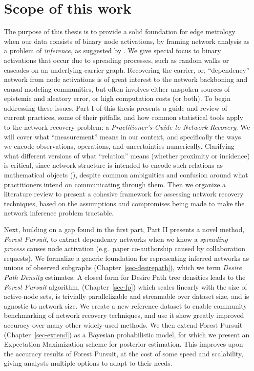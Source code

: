 \documentclass[%
	12pt,
		oneside,
		letterpaper
]{book}
\begin{document}
\section{Scope of this work}\label{scope-of-this-work}

The purpose of this thesis is to provide a solid foundation for edge
metrology when our data consists of binary node activations, by framing
network analysis as a problem of \emph{inference}, as suggested by
\textcite{Statisticalinferencelinks_Peel2022}. We give special focus to
binary activations that occur due to spreading processes, such as random
walks or cascades on an underlying carrier graph. Recovering the
carrier, or, ``dependency'' network from node activations is of great
interest to the network backboning and causal modeling communities, but
often involves either unspoken sources of epistemic and aleatory error,
or high computation costs (or both). To begin addressing these issues,
Part I of this thesis presents a guide and review of current practices,
some of their pitfalls, and how common statistical tools apply to the
network recovery problem: a \emph{Practitioner's Guide to Network
Recovery}. We will cover what ``measurement'' means in our context, and
specifically the ways we encode observations, operations, and
uncertainties numerically. Clarifying what different versions of what
``relation'' means (whether proximity or incidence) is critical, since
network structure is intended to encode such relations as mathematical
objects (), despite common ambiguities and confusion around what
practitioners intend on communicating through them. Then we organize a
literature review to present a cohesive framework for assessing network
recovery techniques, based on the assumptions and compromises being made
to make the network inference problem tractable.

Next, building on a gap found in the first part, Part II presents a
novel method, \emph{Forest Pursuit}, to extract dependency networks when
we know a \emph{spreading process} causes node activation (e.g.~paper
co-authorship caused by collaboration requests). We formalize a generic
foundation for representing inferred networks as unions of observed
subgraphs (Chapter~\ref{sec-desirepath}), which we term \emph{Desire
Path Density} estimates. A closed form for Desire Path tree densities
leads to the \emph{Forest Pursuit} algorithm, (Chapter~\ref{sec-fp})
which scales linearly with the size of active-node sets, is trivially
parallelizable and streamable over dataset size, and is agnostic to
network size. We create a new reference dataset to enable community
benchmarking of network recovery techniques, and use it show greatly
improved accuracy over many other widely-used methods. We then extend
Forest Pursuit (Chapter~\ref{sec-extend}) as a Bayesian probabilistic
model, for which we present an Expectation Maximization scheme for
posterior estimation. This improves upon the accuracy results of Forest
Pursuit, at the cost of some speed and scalability, giving analysts
multiple options to adapt to their needs.
\end{document}
